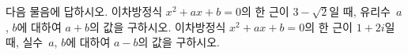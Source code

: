 다음 물음에 답하시오.
 이차방정식 $x^2+ax+b=0$의 한 근이 $3-\sqrt{2}$일 때, 유리수~$a$, $b$에 대하여 $a+b$의 값을 구하시오.
 이차방정식 $x^2+ax+b=0$의 한 근이 $1+2i$일 때, 실수~$a$, $b$에 대하여 $a-b$의 값을 구하시오. 
